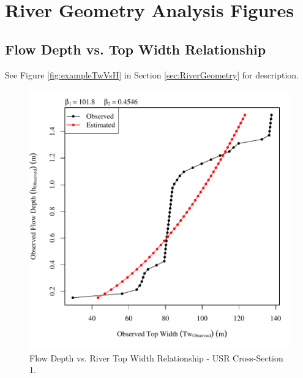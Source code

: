 \renewcommand{\thechapter}{B}

\chapter{River Geometry Analysis Figures}

\section{Flow Depth vs. Top Width Relationship}
\label{App:TwVsH}

See Figure \ref{fig:exampleTwVsH} in Section \ref{sec:RiverGeometry} for description.

\begin{center}
\begin{figure}[htbp]
	\includegraphics[width=6in]{"Figures/Results_USR/Survey Tw vs H-Section 1"}
	\caption{Flow Depth vs. River Top Width Relationship - USR Cross-Section 1.}
\end{figure}
\end{center}
\newpage


